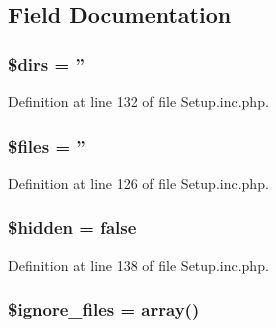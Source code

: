 \subsection{\-Field \-Documentation}
\hypertarget{classphp_documentor__setup_a1b709c1d79631ebc8320b41bda028b54}{
\subsubsection[{\$dirs}]{\setlength{\rightskip}{0pt plus 5cm}\$dirs = ''}}\label{classphp_documentor__setup_a1b709c1d79631ebc8320b41bda028b54}


\-Definition at line 132 of file \-Setup.\-inc.\-php.

\hypertarget{classphp_documentor__setup_a9590b15215a21e9b42eb546aeef79704}{
\subsubsection[{\$files}]{\setlength{\rightskip}{0pt plus 5cm}\$files = ''}}\label{classphp_documentor__setup_a9590b15215a21e9b42eb546aeef79704}


\-Definition at line 126 of file \-Setup.\-inc.\-php.

\hypertarget{classphp_documentor__setup_a4a374564d2858d8ae869a8fb890aad56}{
\subsubsection[{\$hidden}]{\setlength{\rightskip}{0pt plus 5cm}\$hidden = false}}\label{classphp_documentor__setup_a4a374564d2858d8ae869a8fb890aad56}


\-Definition at line 138 of file \-Setup.\-inc.\-php.

\hypertarget{classphp_documentor__setup_a67c9fe86936493085f0f1ceadf36427c}{
\subsubsection[{\$ignore\-\_\-files}]{\setlength{\rightskip}{0pt plus 5cm}\$ignore\-\_\-files = array()}}\label{classphp_documentor__setup_a67c9fe86936493085f0f1ceadf36427c}


